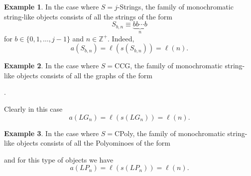 \documentclass[letterpaper,12pt]{article}
\theoremstyle{definition}
\newtheorem{exmp}{Example}[section]
\newtheorem{definition}{Definition}
\begin{document}

\begin{exmp}
    In the case where $S=j$-Strings, the family of monochromatic string-like objects consists of all the strings of the form 
    \begin{equation*}
        S_{b,n} \equiv \underbrace{bb\cdots b}_{n}
    \end{equation*}
    for $b \in \{0,1,\dots,j-1\}$ and $n \in \mathbb{Z}^+$. Indeed, 
    \begin{equation*}
a(S_{b,n})=\ell(s(S_{b,n}))=\ell(n).
    \end{equation*}
\end{exmp}


\begin{exmp} In the case where $S=$CCG, the family of monochromatic string-like objects consists of all the graphs of the form  
\begin{center}
.
\end{center}
Clearly in this case
\begin{equation*}
    a(LG_{n})=\ell(s(LG_{n}))=\ell(n).
\end{equation*}
\end{exmp}

\begin{exmp} In the case where $S=$CPoly, the family of monochromatic string-like objects consists of all the Polyominoes of the form 
\begin{center}
\end{center}
and for this type of objects we have
\begin{equation*}
    a(LP_{n})=\ell(s(LP_{n}))=\ell(n).
\end{equation*}
\end{exmp}
\end{document}
